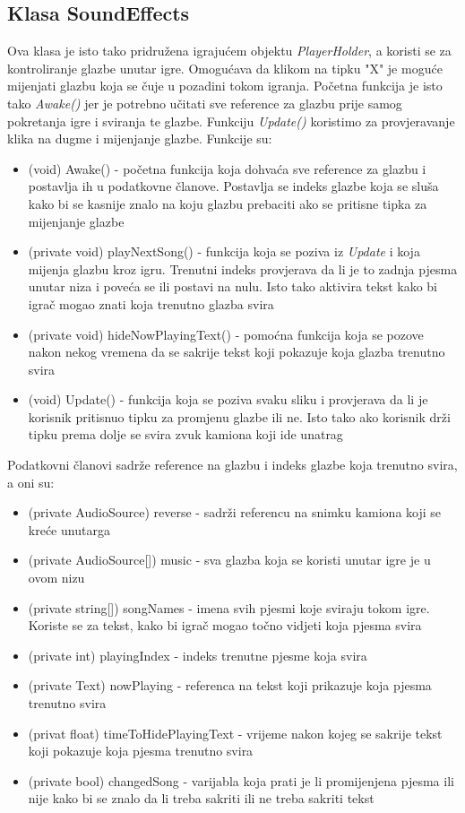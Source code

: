 \subsection{Klasa SoundEffects}
Ova klasa je isto tako pridružena igrajućem objektu \emph{PlayerHolder}, a koristi se za kontroliranje glazbe unutar igre. Omogućava da klikom na tipku "X" je moguće mijenjati glazbu koja se čuje u pozadini tokom igranja. Početna funkcija je isto tako \emph{Awake()} jer je potrebno učitati sve reference za glazbu prije samog pokretanja igre i sviranja te glazbe. Funkciju \emph{Update()} koristimo za provjeravanje klika na dugme i mijenjanje glazbe. Funkcije su:
\begin{itemize}
	\item (void) Awake() - početna funkcija koja dohvaća sve reference za glazbu i postavlja ih u podatkovne članove. Postavlja se indeks glazbe koja se sluša kako bi se kasnije znalo na koju glazbu prebaciti ako se pritisne tipka za mijenjanje glazbe
	\item (private void) playNextSong() - funkcija koja se poziva iz \emph{Update} i koja mijenja glazbu kroz igru. Trenutni indeks provjerava da li je to zadnja pjesma unutar niza i poveća se ili postavi na nulu. Isto tako aktivira tekst kako bi igrač mogao znati koja trenutno glazba svira
	\item (private void) hideNowPlayingText() - pomoćna funkcija koja se pozove nakon nekog vremena da se sakrije tekst koji pokazuje koja glazba trenutno svira
	\item (void) Update() - funkcija koja se poziva svaku sliku i provjerava da li je korisnik pritisnuo tipku za promjenu glazbe ili ne. Isto tako ako korisnik drži tipku prema dolje se svira zvuk kamiona koji ide unatrag
\end{itemize}
Podatkovni članovi sadrže reference na glazbu i indeks glazbe koja trenutno svira, a oni su:
\begin{itemize}
	\item (private AudioSource) reverse - sadrži referencu na snimku kamiona koji se kreće unutarga
	\item (private AudioSource[]) music - sva glazba koja se koristi unutar igre je u ovom nizu
	\item (private string[]) songNames - imena svih pjesmi koje sviraju tokom igre. Koriste se za tekst, kako bi igrač mogao točno vidjeti koja pjesma svira
	\item (private int) playingIndex - indeks trenutne pjesme koja svira
	\item (private Text) nowPlaying - referenca na tekst koji prikazuje koja pjesma trenutno svira
	\item (privat float) timeToHidePlayingText - vrijeme nakon kojeg se sakrije tekst koji pokazuje koja pjesma trenutno svira 
	\item (private bool) changedSong - varijabla koja prati je li promijenjena pjesma ili nije kako bi se znalo da li treba sakriti ili ne treba sakriti tekst
\end{itemize}
